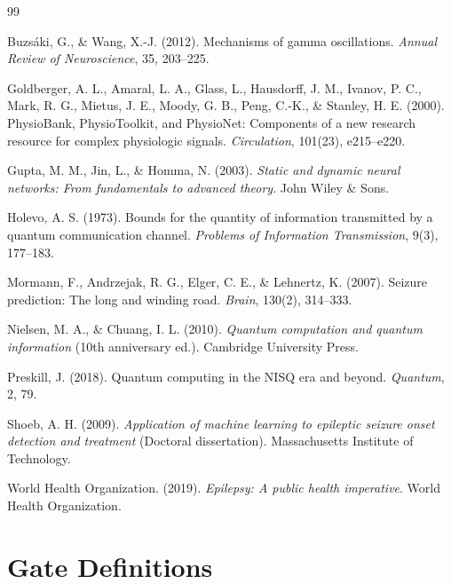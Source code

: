 \documentclass[11pt,a4paper]{article}
\begin{document}
\begin{thebibliography}{99}

Buzs\'{a}ki, G., \& Wang, X.-J. (2012). Mechanisms of gamma oscillations. \textit{Annual Review of Neuroscience}, 35, 203--225.

Goldberger, A. L., Amaral, L. A., Glass, L., Hausdorff, J. M., Ivanov, P. C., Mark, R. G., Mietus, J. E., Moody, G. B., Peng, C.-K., \& Stanley, H. E. (2000). PhysioBank, PhysioToolkit, and PhysioNet: Components of a new research resource for complex physiologic signals. \textit{Circulation}, 101(23), e215--e220.

Gupta, M. M., Jin, L., \& Homma, N. (2003). \textit{Static and dynamic neural networks: From fundamentals to advanced theory}. John Wiley \& Sons.

Holevo, A. S. (1973). Bounds for the quantity of information transmitted by a quantum communication channel. \textit{Problems of Information Transmission}, 9(3), 177--183.

Mormann, F., Andrzejak, R. G., Elger, C. E., \& Lehnertz, K. (2007). Seizure prediction: The long and winding road. \textit{Brain}, 130(2), 314--333.

Nielsen, M. A., \& Chuang, I. L. (2010). \textit{Quantum computation and quantum information} (10th anniversary ed.). Cambridge University Press.

Preskill, J. (2018). Quantum computing in the NISQ era and beyond. \textit{Quantum}, 2, 79.

Shoeb, A. H. (2009). \textit{Application of machine learning to epileptic seizure onset detection and treatment} (Doctoral dissertation). Massachusetts Institute of Technology.

World Health Organization. (2019). \textit{Epilepsy: A public health imperative}. World Health Organization.

\end{thebibliography}

\appendix

\section{Gate Definitions}
\end{document}
